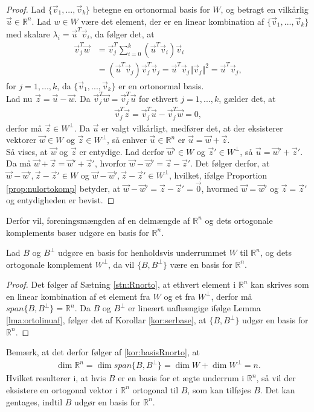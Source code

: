 \begin{proof}
Lad $\{\vec{v}_1,...,\vec{v}_k\}$ betegne en ortonormal basis for $W$, og betragt en vilkårlig $\vec{u} \in \mathds{R}^n$. 
Lad $w \in W$ være det element, der er en linear kombination af $\{\vec{v}_1,...,\vec{v}_k\}$ med skalare $\lambda_i = \vec{u}^T\vec{v}_i$, da følger det, at
\begin{align*}
\vec{v}_j^T\vec{w} &= \vec{v}_j^T\sum_{i=0}^k(\vec{u}^T\vec{v}_i)\vec{v}_i
\\ & = (\vec{u}^T\vec{v}_j)\vec{v}_j^T\vec{v}_j = \vec{u}^T\vec{v}_j \Vert \vec{v}_j \Vert^2 = \vec{u}^T\vec{v}_j,
\end{align*}
for $j=1,...,k$, da $\{\vec{v}_1,...,\vec{v}_k\}$ er en ortonormal basis.
\\ Lad nu $\vec{z} = \vec{u}- \vec{w}$.
Da $\vec{v}_j^T\vec{w}= \vec{v}_j^T\vec{u}$ for ethvert $j=1,...,k$, gælder det, at 
\begin{align*}
\vec{v}_j^T\vec{z} = \vec{v}_j^T\vec{u}- \vec{v}_j^T\vec{w} = 0,
\end{align*}
derfor må $\vec{z} \in W^{\bot}$. 
Da $\vec{u}$ er valgt vilkårligt, medfører det, at der eksisterer vektorer $\vec{w} \in W$ og $\vec{z} \in W^{\bot}$, så enhver $\vec{u} \in \mathds{R}^n$ er $\vec{u}= \vec{w}+\vec{z}$.
\\Så vises, at $\vec{w}$ og $\vec{z}$ er entydige.
Lad derfor $\vec{w}' \in W$ og $\vec{z}' \in W^{\bot}$, så $\vec{u}= \vec{w}' + \vec{z}'$.
Da må $\vec{w} + \vec{z} = \vec{w}' + \vec{z}'$, hvorfor $\vec{w}-\vec{w}' = \vec{z}-\vec{z}'$.
Det følger derfor, at $\vec{w}-\vec{w}', \vec{z}-\vec{z}' \in W$ og $\vec{w}-\vec{w}', \vec{z}-\vec{z}' \in W^{\bot}$, hvilket, ifølge Proportion \ref{prop:nulortokomp} betyder, at $\vec{w}-\vec{w}' = \vec{z}-\vec{z}' = \vec{0}$, hvormed $\vec{w}= \vec{w}'$ og $\vec{z}=\vec{z}'$ og entydigheden er bevist.
\end{proof}
Derfor vil, foreningsmængden af en delmængde af $\mathds{R}^n$ og dets ortogonale komplements baser udgøre en basis for $\mathds{R}^n$.
\begin{kor}
Lad $B$  og $B^{\bot}$ udgøre en basis for henholdsvis underrummet $W$ til $\mathds{R}^n$, og dets ortogonale komplement $W^{\bot}$, da vil $\{B, B^{\bot}\}$ være en basis for $\mathds{R}^n$.
\label{kor:basisRnorto}
\end{kor}
\begin{proof}
Det følger af Sætning \ref{stn:Rnorto}, at ethvert element i $\mathds{R}^n$ kan skrives som en linear kombination af et element fra $W$ og et fra $W^{\bot}$, derfor må $span\{B, B^{\bot}\} = \mathds{R}^n$. 
Da $B$ og $B^{\bot}$ er lineært uafhængige ifølge Lemma \ref{lma:ortolinuaf}, følger det af Korollar \ref{kor:serbase}, at $\{B, B^{\bot}\}$ udgør en basis for $\mathds{R}^n$.
\end{proof}
Bemærk, at det derfor følger af \ref{kor:basisRnorto}, at
\begin{align}
\dim{\mathds{R}^n} = \dim{span\{B, B^{\bot}\}} = \dim{W} + \dim{W^{\bot}} = n.
\end{align}
Hvilket resulterer i, at hvis $B$ er en basis for et ægte underrum i $\mathds{R}^n$, så vil der eksistere en ortogonal vektor i $\mathds{R}^n$ ortogonal til $B$, som kan tilføjes $B$. 
Det kan gentages, indtil $B$ udgør en basis for $\mathds{R}^n$.
